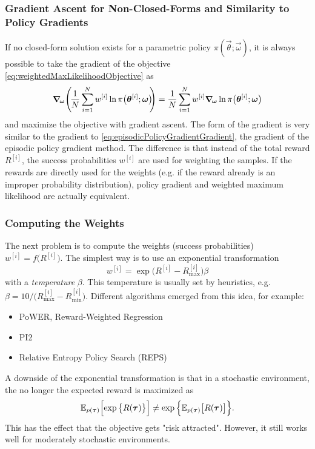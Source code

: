 			\subsubsection{Gradient Ascent for Non-Closed-Forms and Similarity to Policy Gradients}
				If no closed-form solution exists for a parametric policy \( \pi(\vec{\theta}; \vec{\omega}) \), it is always possible to take the gradient of the objective \eqref{eq:weightedMaxLikelihoodObjective} as
				\begin{equation*}
					\grad_{\!\bm{\omega}}\Bigg(\! \frac{1}{N} \sum_{i = 1}^{N} w^{[i]} \ln \pi\big(\bm{\theta}^{[i]}; \bm{\omega}\big) \!\!\Bigg)
					= \frac{1}{N} \sum_{i = 1}^{N} w^{[i]} \grad_{\!\bm{\omega}} \ln \pi\big(\bm{\theta}^{[i]}; \bm{\omega}\big)
				\end{equation*}
				and maximize the objective with gradient ascent. The form of the gradient is very similar to the gradient to \eqref{eq:episodicPolicyGradientGradient}, the gradient of the episodic policy gradient method. The difference is that instead of the total reward \( R^{[i]} \), the success probabilities \( w^{[i]} \) are used for weighting the samples. If the rewards are directly used for the weights (e.g. if the reward already is an improper probability distribution), policy gradient and weighted maximum likelihood are actually equivalent.

			\subsubsection{Computing the Weights}
				The next problem is to compute the weights (success probabilities) \( w^{[i]} = f\big(R^{[i]}\big) \). The simplest way is to use an exponential transformation
				\begin{equation*}
					w^{[i]} = \exp{ \big( R^{[i]} - R^{[i]}_\mathrm{max} \big) \beta }
				\end{equation*}
				with a \emph{temperature} \( \beta \). This temperature is usually set by heuristics, e.g. \( \beta = 10 / \big( R^{[i]}_\mathrm{max} - R^{[i]}_\mathrm{min} \big) \). Different algorithms emerged from this idea, for example:
				\begin{itemize}
					\item {}   PoWER, Reward-Weighted Regression
					\item {} PI2
					\item Relative Entropy Policy Search (REPS)
				\end{itemize}
				A downside of the exponential transformation is that in a stochastic environment, the no longer the expected reward is maximized as
				\begin{equation*}
					\mathbb{E}_{p(\bm{\tau})}\Big[\! \exp\big\{R(\bm{\tau})\big\} \Big] \neq \exp\Big\{ \mathbb{E}_{p(\bm{\tau})}\big[ R(\bm{\tau}) \big] \Big\}.
				\end{equation*}
				This has the effect that the objective gets "risk attracted". However, it still works well for moderately stochastic environments.

